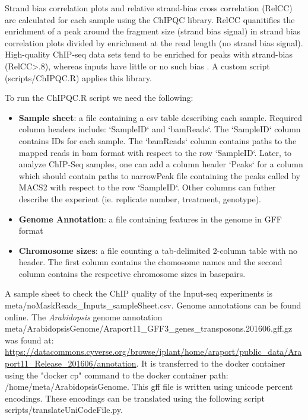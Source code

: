 \documentclass{article}
\begin{document}
\begin{sloppypar}
 Strand bias correlation plots and relative strand-bias cross correlation (RelCC) are calculated for each sample using the ChIPQC library. RelCC quanitifies the enrichment of a peak around the fragment size (strand bias signal) in strand bias correlation plots divided by enrichment at the read length (no strand bias signal).  High-quality ChIP-seq data sets tend to be enriched for peaks with strand-bias (RelCC>.8), whereas inputs have little or no such bias \cite{Landt2012}. A custom script ({\selectfont scripts/ChIPQC.R}) applies this library. 
 
To run the ChIPQC.R script we need the following:
\begin{itemize}
  \item \textbf{Sample sheet}: a file containing a csv table describing each sample. Required column headers include: `SampleID` and `bamReads`. The `SampleID` column contains IDs for each sample. The `bamReads` column contains paths to the mapped reads in bam format with respect to the row `SampleID`. Later, to analyze ChIP-Seq samples, one can add a column header `Peaks` for a column which should contain paths to narrowPeak file containing the peaks called by MACS2 with respect to the row `SampleID`. Other columns can futher describe the experient (ie. replicate number, treatment, genotype).
  \item \textbf{Genome Annotation}: a file containing features in the genome in GFF format
  \item \textbf{Chromosome sizes}: a file counting a tab-delimited 2-column table with no header. The first column contains the chomosome names and the second column contains the respective chromosome sizes in basepairs.
\end{itemize}

A sample sheet to check the ChIP quality of the Input-seq experiments is {\selectfont meta/noMaskReads\_Inputs\_sampleSheet.csv}. Genome annotations can be found online. The \emph{Arabidopsis} genome annotation {\selectfont meta/ArabidopsisGenome/Araport11\_GFF3\_genes\_transposons.201606.gff.gz} was found at: \url{https://datacommons.cyverse.org/browse/iplant/home/araport/public_data/Araport11_Release_201606/annotation}. It is transferred to the docker container using the "docker cp" command to the docker container path: /home/meta/ArabidopsisGenome. This gff file is written using unicode percent encodings. These encodings can be translated using the following script {\selectfont scripts/translateUniCodeFile.py}. 


\end{sloppypar}
\end{document}
